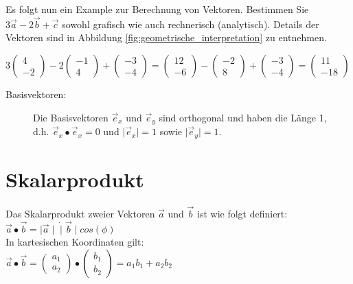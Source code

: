 Es folgt nun ein Example zur Berechnung von Vektoren.
Bestimmen Sie
\begin{math}
	3 \vec{a} - 2 \vec{b} + \vec{c}
\end{math}
sowohl grafisch wie auch rechnerisch (analytisch). Details der Vektoren sind in Abbildung \ref{fig:geometrische_interpretation} zu entnehmen.

\begin{math}
	3 \begin{pmatrix} 4 \\ -2 \end{pmatrix} - 
	2 \begin{pmatrix} -1 \\ 4 \end{pmatrix} + 
	\begin{pmatrix} -3 \\ -4 \end{pmatrix} = 
	\begin{pmatrix} 12 \\ -6 \end{pmatrix} -
	\begin{pmatrix} -2 \\ 8 \end{pmatrix} +
	\begin{pmatrix} -3 \\ -4 \end{pmatrix} =
	\begin{pmatrix} 11 \\ -18 \end{pmatrix}
\end{math}

\begin{description}
	\item[Basisvektoren:]
	Die Basisvektoren $\vec{e}_x$ und $\vec{e}_y$ sind orthogonal und haben die Länge 1,\\
	d.h. $\vec{e}_x \bullet \vec{e}_x = 0$ und $\mid \vec{e}_x \mid = 1$ sowie $\mid \vec{e}_y \mid = 1$.
\end{description}

\section{Skalarprodukt}

Das Skalarprodukt zweier Vektoren $\vec{a}$ und $\vec{b}$ ist wie folgt definiert:\\
$\vec{a} \bullet \vec{b} = \mid \vec{a} \mid \dot \mid \vec{b} \mid cos(\phi)$\\
In kartesischen Koordinaten gilt:\\
$\vec{a} \bullet \vec{b} =
\begin{pmatrix} a_{1} \\ a_{2} \end{pmatrix} \bullet
\begin{pmatrix} b_{1} \\ b_{2} \end{pmatrix} =
a_{1} b_{1} + a_{2} b_{2}$

